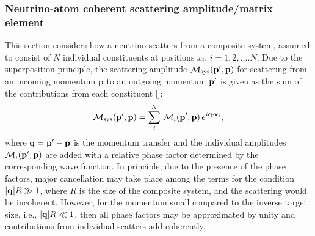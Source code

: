 \subsubsection{Neutrino-atom coherent scattering amplitude/matrix element} 
This section considers how a neutrino scatters from a composite system, assumed to consist of $N$ individual constituents at positions $x_i,\,i=1,2,....N$. Due to the superposition principle, the scattering amplitude $\mathcal{M}_\mathrm{sys}(\bold{p}^\prime,\bold{p})$ for scattering from an incoming momentum $\mathbf{p}$ to an outgoing momentum $\bold{p}^\prime$ is given as the sum of the contributions from each constituent [\cite{Freedman:1977xn,Papavassiliou:2005cs}]:
\begin{align}
\mathcal{M}_\mathrm{sys}(\bold{p}^\prime,\bold{p})=\sum_i^N\,\mathcal{M}_i(\bold{p}^\prime,\bold{p})\,e^{i\bold{q}\cdot\bold{x}_i},
\end{align}
where $\bold{q}=\bold{p}^\prime-\bold{p}$ is the momentum transfer and the individual amplitudes $\mathcal{M}_i(\bold{p}^\prime,\bold{p})$ are added with a relative phase factor determined by the corresponding wave function. %
In principle, due to the presence of the phase factors, major cancellation may take place among the terms for the condition $|\bold{q}|R\gg1$, where $R$ is the size of the composite system, and the scattering would be incoherent. However, for the momentum small compared to the inverse target size, i.e., $|\bold{q}|R\ll1$, then all phase factors may be approximated by unity and contributions from individual scatters add coherently. 



